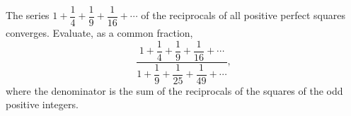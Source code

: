 The series $1+\dfrac14+\dfrac19+\dfrac1{16}+\cdots$ of the reciprocals of all positive perfect squares converges. Evaluate, as a common fraction,
\[\dfrac{1+\dfrac14+\dfrac19+\dfrac1{16}+\cdots}{1+\dfrac19+\dfrac1{25}+\dfrac1{49}+\cdots},\]
where the denominator is the sum of the reciprocals of the squares of the odd positive integers.

